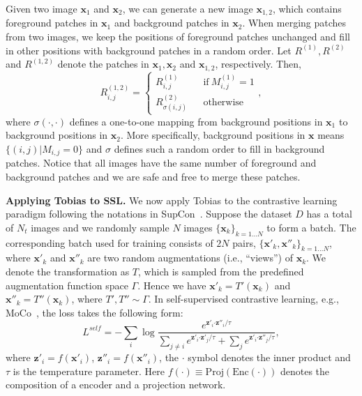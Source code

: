 \documentclass[letterpaper]{article}
\begin{document}
Given two image $\boldsymbol{x}_1$ and $\boldsymbol{x}_2$, we can generate a new image $\boldsymbol{x}_{1,2}$, which contains foreground patches in $\boldsymbol{x}_1$ and background patches in $\boldsymbol{x}_2$. When merging patches from two images, we keep the positions of foreground patches unchanged and fill in other positions with background patches in a random order. Let $R^{(1)},R^{(2)}$ and $R^{(1,2)}$ denote the patches in $\boldsymbol{x}_1, \boldsymbol{x}_2$ and $\boldsymbol{x}_{1,2}$, respectively. Then,
\begin{equation}
	\label{Tk}
	R^{(1,2)}_{i,j} = \left\{
	\begin{array}{rcl}
		R^{(1)}_{i,j}\phantom{0} &  & \text{if} \  M^{(1)}_{i,j}=1\\
		R^{(2)}_{\sigma(i,j)} && {\text{otherwise}}
	\end{array} \right. ,
\end{equation}
where $\sigma(\cdot,\cdot)$ defines a one-to-one mapping from background positions in $\boldsymbol{x}_1$ to background positions in $\boldsymbol{x}_2$. More specifically, background positions in $\boldsymbol{x}$ means $\{(i,j)|M_{i,j}=0\}$ and $\sigma$ defines such a random order to fill in background patches. Notice that all images have the same number of foreground and background patches and we are safe and free to merge these patches.

\textbf{Applying Tobias to SSL.} We now apply Tobias to the contrastive learning paradigm following the notations in SupCon~\citep{supcon:khosla:nips20}. Suppose the dataset $D$ has a total of $N_t$ images and we randomly sample $N$ images $\{\boldsymbol{x}_k\}_{k=1\dots{N}}$ to form a batch. The corresponding batch used for training consists of $2N$ pairs, $\{\boldsymbol{x}'_k,\boldsymbol{x}''_k\}_{k=1\dots{N}}$, where $\boldsymbol{x}'_{k}$ and $\boldsymbol{x}''_{k}$ are two random augmentations (i.e., ``views'') of $\boldsymbol{x}_{k}$. We denote the transformation as $T$, which is sampled from the predefined augmentation function space $\Gamma$. Hence we have $\boldsymbol{x}'_{k}=T'(\boldsymbol{x}_k)$ and $\boldsymbol{x}''_{k}=T''(\boldsymbol{x}_k)$, where $T',T''\sim\Gamma$. In self-supervised contrastive learning, e.g., MoCo~\citep{moco:kaiming:CVPR20}, the loss takes the following form:
\begin{equation}
	L^{self}=-\sum_{i} \log \frac{e^{\boldsymbol{z}'_i\boldsymbol{\cdot}\boldsymbol{z}''_i/\tau}}{\sum_{j\neq i} e^{\boldsymbol{z}'_i\boldsymbol{\cdot} \boldsymbol{z}'_j/\tau}+\sum_{j} e^{\boldsymbol{z}'_i\boldsymbol{\cdot} \boldsymbol{z}''_j/\tau}},
\end{equation}
where $\boldsymbol{z}'_i=f(\boldsymbol{x}'_i)$, $\boldsymbol{z}''_i=f(\boldsymbol{x}''_i)$, the $\boldsymbol{\cdot}$ symbol denotes the inner product and $\tau$ is the temperature parameter. Here $f(\cdot)\equiv\text{Proj}(\text{Enc}(\cdot))$ denotes the composition of a encoder and a projection network.
\end{document}
